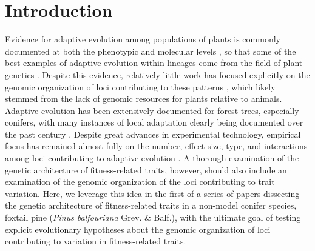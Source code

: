 \documentclass[smallextended]{svjour3}
\begin{document}
\section*{Introduction}

Evidence for adaptive evolution among populations of plants is commonly
documented at both the phenotypic and molecular levels \citep{Kawecki:2004,
  Pannell:2013}, so that some of the best examples of adaptive evolution within
lineages come from the field of plant genetics \citep[e.g.,][]{Antonovics:1970}.
Despite this evidence, relatively little work has focused explicitly on the
genomic organization of loci contributing to these patterns
\citep{Hoffman:2008}, which likely stemmed from the lack of genomic resources
for plants relative to animals.  Adaptive evolution has been extensively
documented for forest trees, especially conifers, with many instances of local
adaptation clearly being documented over the past century \citep{White:2007,
  Neale:2011}. Despite great advances in experimental technology, empirical
focus has remained almost fully on the number, effect size, type, and
interactions among loci contributing to adaptive evolution \citep{Neale:2011,
  Alberto:2013}.  A thorough examination of the genetic architecture of
fitness-related traits, however, should also include an examination of the
genomic organization of the loci contributing to trait variation. Here, we
leverage this idea in the first of a series of papers dissecting the genetic
architecture of fitness-related traits in a non-model conifer species, foxtail
pine (\textit{Pinus balfouriana} Grev. \& Balf.), with the ultimate goal of
testing explicit evolutionary hypotheses about the genomic organization of loci
contributing to variation in fitness-related traits.
\end{document}
